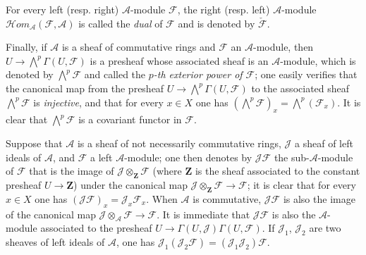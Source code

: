 \begin{env}[4.1.5]
For every left (resp. right) $\mathcal{A}$-module $\mathcal{F}$, the
right (resp. left) $\mathcal{A}$-module
$\mathcal{H}\!om_{\mathcal{A}}(\mathcal{F},\mathcal{A})$ is called the
\emph{dual} of $\mathcal{F}$ and is denoted by $\check{\mathcal{F}}$.

Finally, if $\mathcal{A}$ is a sheaf of commutative rings and
$\mathcal{F}$ an $\mathcal{A}$-module, then
$U\to\bigwedge^p\Gamma(U,\mathcal{F})$ is a presheaf whose
associated sheaf is an $\mathcal{A}$-module, which is denoted by
$\bigwedge^p\mathcal{F}$ and called the \emph{$p$-th exterior power
of $\mathcal{F}$}; one easily verifies that the canonical map from the
presheaf $U\to\bigwedge^p\Gamma(U,\mathcal{F})$ to the
associated sheaf $\bigwedge^p\mathcal{F}$ is \emph{injective}, and that for every
$x\in X$ one has
$(\bigwedge^p\mathcal{F})_x=\bigwedge^p(\mathcal{F}_x)$. It is clear that
$\bigwedge^p\mathcal{F}$ is a covariant functor in $\mathcal{F}$.
\end{env}

\begin{env}[4.1.6]
\label{0.4.1.6}
Suppose that $\mathcal{A}$ is a sheaf of not necessarily
commutative rings, $\mathcal{J}$ a sheaf of left ideals of $\mathcal{A}$,
and $\mathcal{F}$ a left $\mathcal{A}$-module; one then denotes by
$\mathcal{J}\mathcal{F}$ the sub-$\mathcal{A}$-module of $\mathcal{F}$
that is the image of $\mathcal{J}\otimes_{\mathbf Z}\mathcal{F}$ (where $\mathbf Z$ is the
sheaf associated to the constant presheaf $U\to\mathbf Z$) under the
canonical map $\mathcal{J}\otimes_{\mathbf Z}\mathcal{F}\to\mathcal{F}$; it is
clear that for every $x\in X$ one has
$(\mathcal{J}\mathcal{F})_x=\mathcal{J}_x\mathcal{F}_x$. When
$\mathcal{A}$ is commutative, $\mathcal{J}\mathcal{F}$ is also the image
of the canonical map $\mathcal{J}\otimes_{\mathcal{A}}\mathcal{F}\to\mathcal{F}$.
It is immediate that $\mathcal{J}\mathcal{F}$ is also the
$\mathcal{A}$-module associated to the presheaf
$U\to\Gamma(U,\mathcal{J})\Gamma(U,\mathcal{F})$. If
$\mathcal{J}_1$, $\mathcal{J}_2$ are two sheaves of left ideals of
$\mathcal{A}$, one has
$\mathcal{J}_1(\mathcal{J}_2\mathcal{F})=(\mathcal{J}_1\mathcal{J}_2)\mathcal{F}$.
\end{env}

